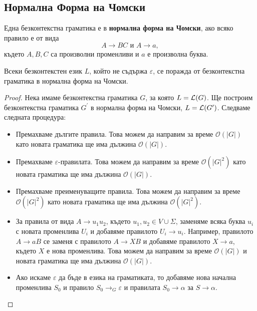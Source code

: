 \subsection{Нормална Форма на Чомски}
Една безконтекстна граматика е в {\bf нормална форма на Чомски}, ако
всяко правило е от вида
\[A \rightarrow BC\mbox{ и }A \rightarrow a,\]
където $A, B, C$ са произволни променливи и $a$ е произволна буква.

\begin{framed}
  \begin{theorem}
    Всеки безконтекстен език $L$, който не съдържа $\varepsilon$, се поражда от безконтекстна граматика в нормална форма на Чомски.
  \end{theorem}
\end{framed}
\begin{proof}
  Нека имаме безконтекстна граматика $G$, за която $L = \mathcal{L}(G)$.
  Ще построим безконтекстна граматика $G^\prime$ в нормална форма на Чомски, $L = \mathcal{L}(G^\prime)$.
  Следваме следната процедура:
  \begin{itemize}
  \item
    Премахваме дългите правила.
    Това можем да направим за време $\mathcal{O}(|G|)$
    като новата граматика ще има дължина $\mathcal{O}(|G|)$.
  \item
    Премахваме $\varepsilon$-правилата.
    Това можем да направим за време $\mathcal{O}(|G|^2)$
    като новата граматика ще има дължина $\mathcal{O}(|G|)$.
  \item
    Премахваме преименуващите правила.
    Това можем да направим за време $\mathcal{O}(|G|^2)$
    като новата граматика ще има дължина $\mathcal{O}(|G|^2)$.
  \item
    За правила от вида $A\to u_1 u_2$, където $u_1, u_2 \in V \cup \Sigma$, 
    заменяме всяка буква $u_i$ с новата променлива $U_i$
    и добавяме правилото $U_i\to u_i$.
    Например, правилото $A \to aB$ се заменя с правилото $A \to XB$ и добавяме правилото $X \to a$,
    където $X$ е нова променлива.
    Това можем да направим за време $\mathcal{O}(|G|)$ и новата граматика ще има дължина $\mathcal{O}(|G|)$.
  \item
    Ако искаме $\varepsilon$ да бъде в езика на граматиката, то добавяме нова начална променлива $S_0$
    и правило $S_0 \to_G \varepsilon$ и правилата $S_0 \to \alpha$ за $S \to \alpha$.
  \end{itemize}
\end{proof}

